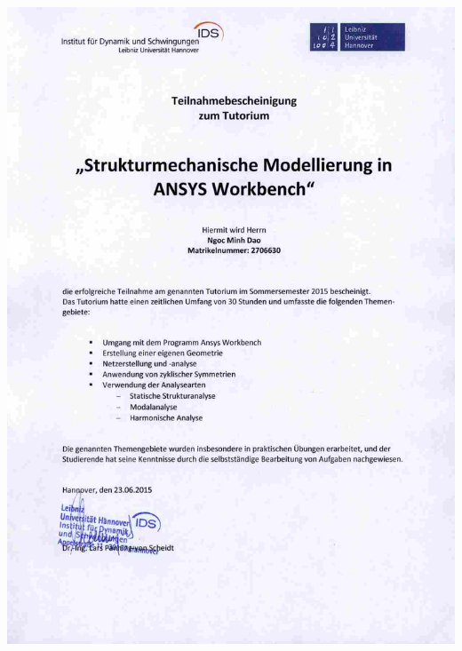 \documentclass[12pt,a4paper]{scrartcl}
\begin{document}
\includegraphics [width=\linewidth, height=\textheight] {./zeugnisse/ids_ansys_workbench_lq.jpg}



\end{document}
